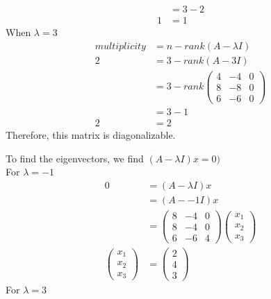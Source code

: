 \documentclass[13pt]{article}
\begin{document}
\begin{enumerate}[label=(\alph*),leftmargin=*]
\begin{enumerate}
\begin{align*}
                   &= 3 - 2 \\
      1 &= 1
    \end{align*}
    When $\lambda = 3$
    \begin{align*}
      multiplicity &= n - rank(A - \lambda I) \\
      2 &= 3 - rank(A - 3I) \\
                   &= 3 - rank
                     \begin{pmatrix}
                       4 & -4 & 0 \\
                       8 & -8 & 0 \\
                       6 & -6 & 0
                     \end{pmatrix} \\
                   &= 3 - 1 \\
      2 &= 2
    \end{align*}      
    Therefore, this matrix is diagonalizable.
  \end{enumerate}
  To find the eigenvectors, we find $(A - \lambda I)x = 0)$ \\
  For $\lambda = -1$
  \begin{align*}
    0 &= (A - \lambda I)x \\
      &= (A - -1I)x \\
      &=
        \begin{pmatrix}
          8 & -4 & 0 \\
          8 & -4 & 0 \\
          6 & -6 & 4
        \end{pmatrix}
        \begin{pmatrix}
          x_1 \\
          x_2 \\
          x_3
        \end{pmatrix} \\
    \begin{pmatrix}
      x_1 \\
      x_2 \\
      x_3
    \end{pmatrix} &=
                    \begin{pmatrix}
                      2 \\
                      4 \\
                      3
                    \end{pmatrix}
  \end{align*}
  For $\lambda = 3$
  \begin{align*}

\end{align*}
\end{enumerate}
\end{document}
